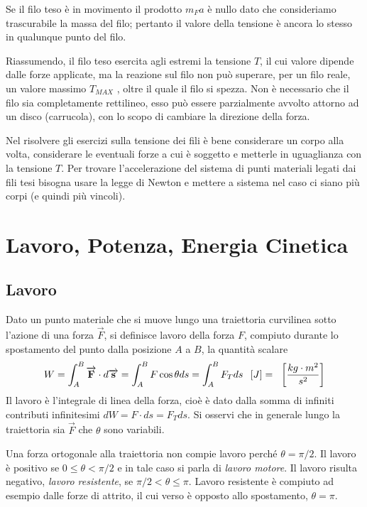 \documentclass[class=book, crop=false, oneside, 12pt]{standalone}
\begin{document}
Se il filo teso è in movimento il prodotto \(m_F a\) è nullo dato che consideriamo trascurabile la massa del filo; pertanto il valore della tensione è ancora lo stesso in qualunque punto del filo.

Riassumendo, il filo teso esercita agli estremi la tensione \(T\), il cui valore dipende dalle forze applicate, ma la reazione sul filo non può superare, per un filo reale, un valore massimo \(T_{MAX}\) , oltre il quale il filo si spezza.\newline
Non è necessario che il filo sia completamente rettilineo, esso può essere parzialmente avvolto attorno ad un disco (carrucola), con lo scopo di cambiare la direzione della forza.

Nel risolvere gli esercizi sulla tensione dei fili è bene considerare un corpo alla volta, considerare le eventuali forze a cui è soggetto e metterle in uguaglianza con la tensione \(T\).
Per trovare l'accelerazione del sistema di punti materiali legati dai fili tesi bisogna usare la legge di Newton e mettere a sistema nel caso ci siano più corpi (e quindi più vincoli).

\section{Lavoro, Potenza, Energia Cinetica}

\subsection{Lavoro}

Dato un punto materiale che si muove lungo una traiettoria curvilinea sotto l'azione di una forza \(\overrightarrow{F}\), si definisce lavoro della forza \(F\), compiuto durante lo spostamento del punto dalla posizione \(A\) a \(B\), la quantità scalare
\begin{equation}
    W = \int_A^B \overrightarrow{F} \cdot d \overrightarrow{s} = \int_A^B F \cos \theta ds = \int_A^B F_T ds \udm{J} = \udm{\frac{kg \cdot m^2}{s^2}}
\end{equation}
Il lavoro è l'integrale di linea della forza, cioè è dato dalla somma di infiniti contributi infinitesimi \(d W = F \cdot d s = F_T d s\).
Si osservi che in generale lungo la traiettoria sia \(\overrightarrow{F}\) che \(\theta\) sono variabili.

Una forza ortogonale alla traiettoria non compie lavoro perché \(\theta = \pi / 2 \).
Il lavoro è positivo se \(0 \leq \theta < \pi / 2\) e in tale caso si parla di \emph{lavoro motore}.
Il lavoro risulta negativo, \emph{lavoro resistente}, se \(\pi / 2 < \theta \leq \pi \).
Lavoro resistente è compiuto ad esempio dalle forze di attrito, il cui verso è opposto allo spostamento, \(\theta = \pi\).
\end{document}
